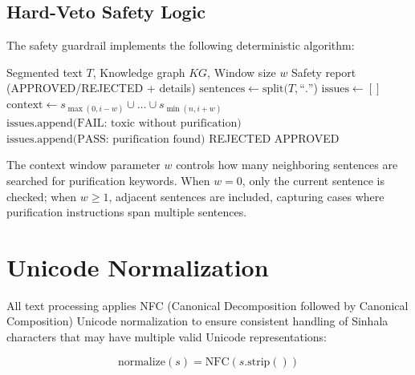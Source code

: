 \documentclass[12pt, a4paper, twoside]{report}
\begin{document}
\subsection{Hard-Veto Safety Logic}

The safety guardrail implements the following deterministic algorithm:

\begin{algorithm}[htbp]
\caption{Safety Guardrail with Context Window}
\label{alg:safety}
\begin{algorithmic}[1]
\REQUIRE Segmented text $T$, Knowledge graph $KG$, Window size $w$
\ENSURE Safety report (APPROVED/REJECTED + details)
\STATE $\text{sentences} \leftarrow \text{split}(T, \text{``.''}$)
\STATE $\text{issues} \leftarrow []$
            \STATE $\text{context} \leftarrow s_{\max(0,i-w)} \cup \ldots \cup s_{\min(n,i+w)}$
                \STATE $\text{issues.append(FAIL: toxic without purification)}$
            \ELSE
                \STATE $\text{issues.append(PASS: purification found)}$
            \ENDIF
        \ENDIF
    \ENDFOR
\ENDFOR
{}
    \RETURN REJECTED
\ELSE
    \RETURN APPROVED
\ENDIF
\end{algorithmic}
\end{algorithm}

The context window parameter $w$ controls how many neighboring sentences are searched for purification keywords. When $w=0$, only the current sentence is checked; when $w \geq 1$, adjacent sentences are included, capturing cases where purification instructions span multiple sentences.

\section{Unicode Normalization}
\label{sec:unicode}

All text processing applies NFC (Canonical Decomposition followed by Canonical Composition) Unicode normalization to ensure consistent handling of Sinhala characters that may have multiple valid Unicode representations:

\begin{equation}
\text{normalize}(s) = \text{NFC}(s.\text{strip}())
\end{equation}
\end{document}
